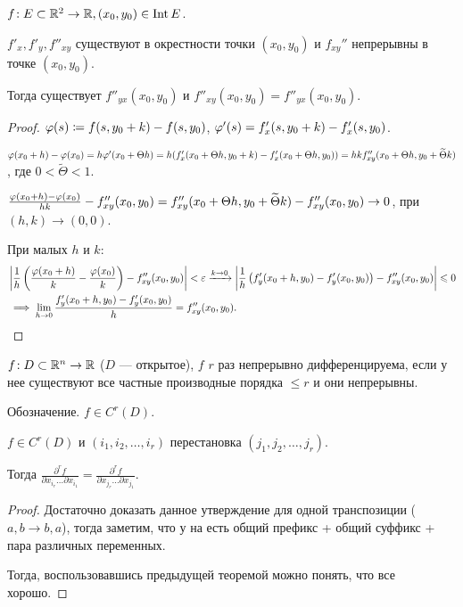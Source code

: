 \begin{theorem}
    $f\!: E \subset \mathbb{R}^2 \to \mathbb{R}, (x_0, y_0) \in \operatorname{Int} E$.

    $f'_x, f'_y, f''_{xy}$ существуют в окрестности  точки  $(x_0, y_0)$ и $f_{xy}''$ непрерывны в точке  $(x_0, y_0)$.

    Тогда существует $f''_{yx}(x_0, y_0)$ и $f''_{xy}(x_0, y_0) = f''_{yx}(x_0, y_0)$.
\end{theorem}
\begin{proof}
    $\varphi(s) \coloneqq f(s, y_0 + k) - f(s, y_0)$, $\varphi'(s) = f'_x(s, y_0 + k) - f'_x(s, y_0)$.

    $\varphi(x_0+h) - \varphi(x_0) = h\varphi'(x_0 + \Theta h) = h(f'_x(x_0 + \Theta h, y_0 + k) - f'_x(x_0 + \Theta h, y_0)) = hk f''_{xy}(x_0 + \Theta h, y_0 + \widetilde{\Theta}k)$, где $0 < \widetilde{\Theta} < 1$.

    $\frac{\varphi(x_0 + h) - \varphi(x_0)}{hk} - f''_{xy}(x_0, y_0) = f''_{xy}(x_0 + \Theta h, y_0 + \widetilde{\Theta}k) - f''_{xy}(x_0, y_0) \to 0$, при $(h, k) \to (0, 0)$.

    При малых $h$ и  $k$:
    \begin{align*}
    &\left| \frac{1}{h} \left(\frac{\varphi(x_0 + h)}{k} - \frac{\varphi(x_0)}{k}\right) - f''_{xy}(x_0, y_0) \right| < \varepsilon
    \xrightarrow{k \to 0} \left| \frac{1}{h} \left( f'_y(x_0+h, y_0) - f'_y(x_0, y_0) \right) - f''_{xy}(x_0, y_0) \right| \leqslant 0 \\
    & \implies \lim\limits_{h \to 0} \frac{f'_y(x_0+h, y_0) - f'_y(x_0, y_0)}{h} = f''_{xy}(x_0, y_0).
    \end{align*}
\end{proof}
\begin{definition}
    $f\!: D \subset \mathbb{R}^n \to \mathbb{R}$ ($D$ --- открытое), $f$  $r$ раз непрерывно дифференцируема, если у нее существуют все частные производные порядка  $\le r$ и они непрерывны.

    Обозначение. $f \in C^r(D)$.
\end{definition}
\begin{theorem}
    $f \in C^r(D)$ и $(i_1, i_2, \ldots, i_r)$ перестановка $(j_1, j_2,\ldots,j_r)$.

Тогда $\frac{\partial^r f}{\partial x_{i_r}\ldots\partial x_{i_1}} = \frac{\partial^r f}{\partial x_{j_r} \ldots \partial x_{j_1}}$.
\end{theorem}
\begin{proof}
    Достаточно доказать данное утверждение для одной транспозиции ($a, b \to b, a$), тогда заметим, что у на есть общий префикс + общий суффикс + пара различных переменных. 

    Тогда, воспользовавшись предыдущей теоремой можно понять, что все хорошо.
\end{proof}
